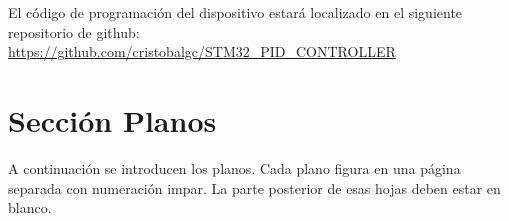 \documentclass[10pt,a4paper,oneside]{article}
\begin{document}
El código de programación del dispositivo estará localizado en el siguiente repositorio de github: \url{https://github.com/cristobalgc/STM32_PID_CONTROLLER}

\bigskip

\section{Sección Planos}%

A continuación se introducen los planos. Cada plano figura en una página separada con numeración impar. La parte posterior de esas hojas deben estar en blanco.




\cleardoublepage
\begin{Plano}[!htb]
\caption[Esquema electrónico de la placa Blue pill]{} %
\label{BluePillSch} %
\end{Plano}


\cleardoublepage
\begin{Plano}[!htb]
\caption[Esquema electrónico del expansor de entradas-salidas IIC]{} %
\label{PCF8574Sch} %
\end{Plano}

\end{document}

